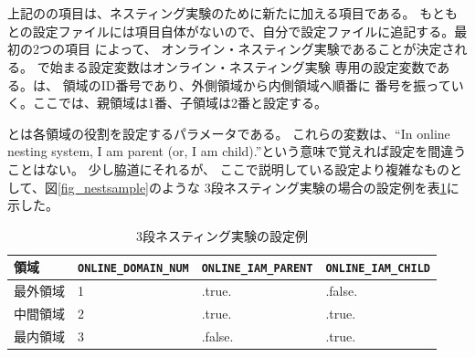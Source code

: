 \\
{\small {\gt
{}}}\\

\noindent 上記のの項目は、ネスティング実験のために新たに加える項目である。
もともとの設定ファイルには項目自体がないので、自分で設定ファイルに追記する。最初の2つの項目
によって、
オンライン・ネスティング実験であることが決定される。
で始まる設定変数はオンライン・ネスティング実験
専用の設定変数である。は、
領域のID番号であり、外側領域から内側領域へ順番に
番号を振っていく。ここでは、親領域は1番、子領域は2番と設定する。

とは各領域の役割を設定するパラメータである。
これらの変数は、``In online nesting system, I am parent (or, I am child).''という意味で覚えれば設定を間違うことはない。
少し脇道にそれるが、
ここで説明している設定より複雑なものとして、図\ref{fig_nestsample}のような
3段ネスティング実験の場合の設定例を表\ref{tab:triple_nested}に示した。

\begin{table}[htb]
\begin{center}
\caption{3段ネスティング実験の設定例}
\begin{tabularx}{150mm}{|l|l|l|X|} \hline
 \rowcolor[gray]{0.9} 領域 & \verb|ONLINE_DOMAIN_NUM| & \verb|ONLINE_IAM_PARENT| & \verb|ONLINE_IAM_CHILD|\\ \hline
 最外領域 & 1 & .true.  & .false. \\ \hline
 中間領域 & 2 & .true.  & .true. \\ \hline
 最内領域 & 3 & .false. & .true. \\ \hline
\end{tabularx}
\label{tab:triple_nested}
\end{center}
\end{table}


